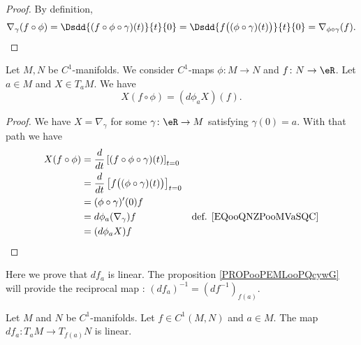 \begin{proof}
	By definition,
	\begin{equation}
		\nabla_{\gamma}(f\circ \phi)=\Dsdd{ (f\circ\phi\circ \gamma)(t) }{t}{0}=\Dsdd{ f\big( (\phi\circ \gamma)(t) \big) }{t}{0}=\nabla_{\phi\circ\gamma}(f).
	\end{equation}
\end{proof}

\begin{proposition}	\label{PROPooMYSMooQnRQyx}
	Let \( M,N\) be \( C^1\)-manifolds. We consider \( C^1\)-maps \( \phi\colon M\to N\) and \( f \colon N\to \eR\). Let \( a\in M\) and \( X\in T_aM\). We have
	\begin{equation}
		X(f\circ\phi)=(d\phi_aX)(f).
	\end{equation}
\end{proposition}

\begin{proof}
	We have \( X=\nabla_{\gamma}\) for some \(\gamma \colon \eR\to M  \) satisfying \( \gamma(0)=a\). With that path we have
	\begin{subequations}
		\begin{align}
			X(f\circ \phi) & =\frac{d}{dt} \left[ (f\circ\phi\circ\gamma)(t)  \right]_{t=0}                                                \\
			               & = \frac{d}{dt} \left[ f\big( (\phi\circ\gamma)(t) \big)  \right]_{t=0}                                        \\
			               & =(\phi\circ\gamma)'(0)f                                                                                       \\
			               & =d\phi_a(\nabla_{\gamma})f                                             & \text{def. \eqref{EQooQNZPooMVaSQC}} \\
			               & =(d\phi_aX)f
		\end{align}
	\end{subequations}
\end{proof}


Here we prove that \( df_a\) is linear. The proposition \ref{PROPooPEMLooPQcywG} will provide the reciprocal map : \( (df_a)^{-1}=(df^{-1})_{f(a)}\).
\begin{proposition}     \label{PROPooNRLVooChhiIS}
	Let \( M\) and \( N\) be \( C^1\)-manifolds. Let \( f\in C^1(M,N)\) and \( a\in M\). The map \( df_a\colon T_aM\to T_{f(a)}N\) is linear.
\end{proposition}


